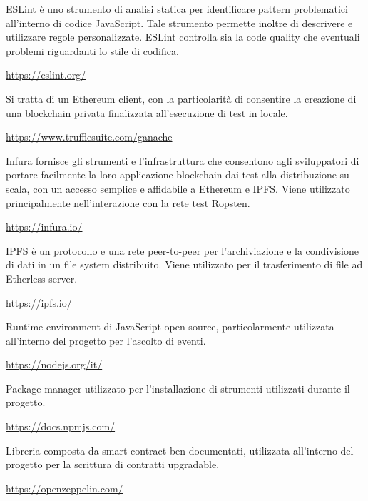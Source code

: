 	ESLint è uno strumento di analisi statica per identificare pattern problematici all'interno di codice JavaScript. Tale strumento permette inoltre di descrivere e utilizzare regole personalizzate. ESLint controlla sia la code quality che eventuali problemi riguardanti lo stile di codifica.
	\begin{center}
		\url{https://eslint.org/}
	\end{center}

	Si tratta di un Ethereum client, con la particolarità di consentire la creazione di una blockchain privata finalizzata all'esecuzione di test in locale.
	\begin{center}
		\url{https://www.trufflesuite.com/ganache}
	\end{center}

	Infura fornisce gli strumenti e l'infrastruttura che consentono agli sviluppatori di portare facilmente la loro applicazione blockchain dai test alla distribuzione su scala, con un accesso semplice e affidabile a Ethereum e IPFS. Viene utilizzato principalmente nell'interazione con la rete test Ropsten.
	\begin{center}
		\url{https://infura.io/}
	\end{center}

	IPFS è un protocollo e una rete peer-to-peer per l'archiviazione e la condivisione di dati in un file system distribuito. Viene utilizzato per il trasferimento di file ad Etherless-server.
	\begin{center}
		\url{https://ipfs.io/}
	\end{center}

	Runtime environment di JavaScript open source, particolarmente utilizzata all'interno del progetto per l'ascolto di eventi.
	\begin{center}
		\url{https://nodejs.org/it/}
	\end{center}

	Package manager utilizzato per l'installazione di strumenti utilizzati durante il progetto.
	\begin{center}
		\url{https://docs.npmjs.com/}
	\end{center}

	Libreria composta da smart contract ben documentati, utilizzata all'interno del progetto per la scrittura di contratti upgradable.
	\begin{center}
		\url{https://openzeppelin.com/}
	\end{center}

